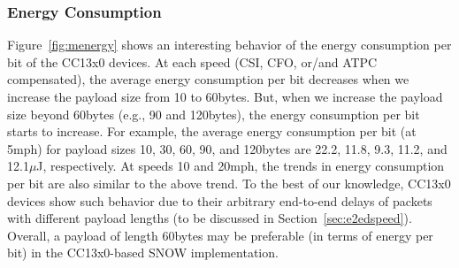 \subsubsection{Energy Consumption}

Figure~\ref{fig:menergy} shows an interesting behavior of the energy consumption per bit of the CC13x0 devices. At each speed (CSI, CFO, or/and ATPC compensated), the average energy consumption per bit decreases when we increase the payload size from 10 to 60bytes. But, when we increase the payload size beyond 60bytes (e.g., 90 and 120bytes), the energy consumption per bit starts to increase. For example, the average energy consumption per bit (at 5mph) for payload sizes 10, 30, 60, 90, and 120bytes are 22.2, 11.8, 9.3, 11.2, and 12.1$\mu$J, respectively. At speeds 10 and 20mph, the trends in energy consumption per bit are also similar to the above trend.
To the best of our knowledge, CC13x0 devices show such behavior due to their arbitrary end-to-end delays of packets with different payload lengths (to be discussed in Section~\ref{sec:e2edspeed}). Overall,  a payload of length 60bytes may be preferable (in terms of energy per bit) in the CC13x0-based SNOW implementation.



